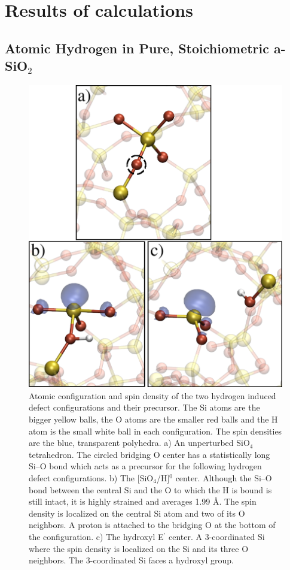 \documentclass[aps,prb,reprint,superscriptaddress,showpacs]{revtex4-1}
\begin{document}
\section{Results of calculations}
\subsection{Atomic Hydrogen in Pure, Stoichiometric a-SiO$_2$}

\label{sec:defect_free}
\begin{figure}[h!]
\includegraphics{hydroxyl_eprime_configurations2.png}
\caption{Atomic configuration and spin density of the two hydrogen induced defect configurations and their precursor. The Si atoms are the bigger yellow balls, the O atoms are the smaller red balls and the H atom is the small white ball in each configuration. The spin densities are the blue, transparent polyhedra. a) An unperturbed SiO$_4$ tetrahedron. The circled bridging O center has a statistically long \mbox{Si--O} bond which acts as a precursor for the following hydrogen defect configurations. b) The [SiO$_4$/H]$^0$ center. Although the \mbox{Si--O} bond between the central Si and the O to which the H is bound is still intact, it is highly strained and averages 1.99 {\AA}. The spin density is localized on the central Si atom and two of its O neighbors. A proton is attached to the bridging O at the bottom of the configuration. c) The hydroxyl E$^\prime$ center. A 3-coordinated Si where the spin density is localized on the Si and its three O neighbors. The 3-coordinated Si faces a hydroxyl group.}
\label{fig:sio2_h_config}
\end{figure}
\end{document}
